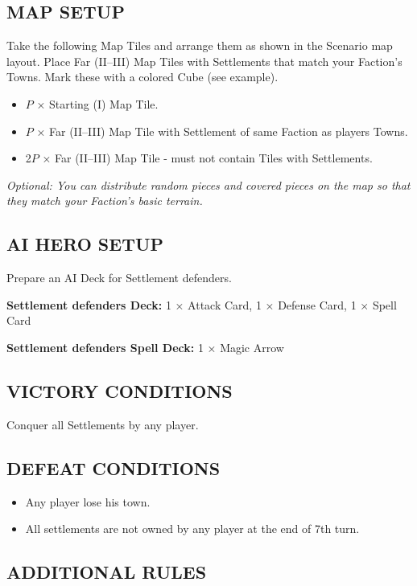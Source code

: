 \begin{multicols}{2}
\subsection*{\MakeUppercase{Map Setup}}

Take the following Map Tiles and arrange them as shown in the Scenario map layout.
Place Far (II--III) Map Tiles with Settlements that match your Faction's Towns. Mark these with a colored Cube (see example).

\begin{itemize}
  \item $P$ × Starting (I) Map Tile.
  \item $P$ × Far (II--III) Map Tile with Settlement of same Faction as players Towns.
  \item 2$P$ × Far (II--III) Map Tile - must not contain Tiles with Settlements.
\end{itemize}

\textit{Optional: You can distribute random pieces and covered pieces on the map so that they match your Faction's basic terrain.}

\subsection*{\MakeUppercase{AI Hero Setup}}

Prepare an AI Deck for Settlement defenders.

\textbf{Settlement defenders Deck:} 1 × Attack Card, 1 × Defense Card, 1 × Spell Card

\textbf{Settlement defenders Spell Deck:} 1 × Magic Arrow

\subsection*{\MakeUppercase{Victory Conditions}}
Conquer all Settlements by any player.

\subsection*{\MakeUppercase{Defeat Conditions}}

\begin{itemize}
  \item Any player lose his town.
  \item All settlements are not owned by any player at the end of 7th turn.
\end{itemize}

\subsection*{\MakeUppercase{Additional Rules}}


\end{multicols}
